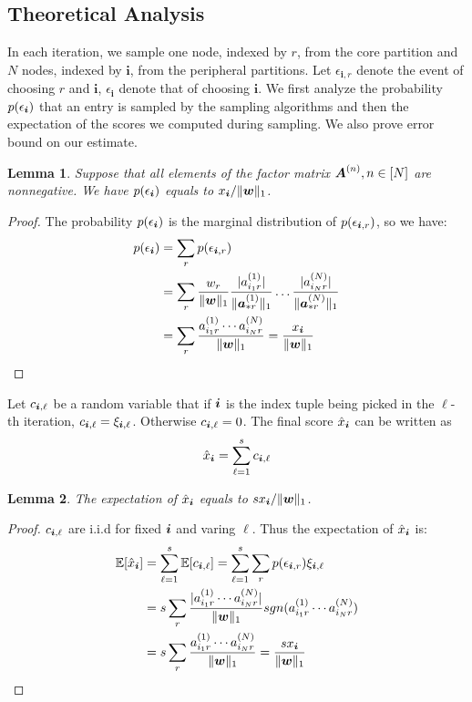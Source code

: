 \documentclass[letterpaper]{article}
\newcommand{\Sca}[3]{{#1}^{(#2)}_{i_#2#3}}%
\newcommand{\anr}[2]{\Sca{a}{#1}{#2}}
\newcommand{\score}[1]{\xi_{\V{i},#1}}
\newcommand{\V}[1]{{\boldsymbol{{\MakeLowercase{#1}}}}}
\newcommand{\ColVec}[3]{\V{#1}^{(#2)}_{#3}}
\newcommand{\NormColA}[2]{\norm{\ColVec{a}{#1}{*#2}}{1}}
\newcommand{\predx}{\hat{x}_{\V{i}}}
\newcommand{\M}[1]{{\boldsymbol{{\MakeUppercase{#1}}}}}
\newcommand{\norm}[2]{\|#1\|_{#2}}
\newtheorem{lemma}{Lemma}
\begin{document}
\subsection{Theoretical Analysis}
In each iteration,
we sample one node, indexed by $r$,
from the core partition and $N$ nodes,
indexed by $\boldsymbol{i}$, from the peripheral partitions.
Let $\epsilon_{\boldsymbol{i},r}$
denote the event of choosing $r$
and $\boldsymbol{i}$, $\epsilon_{\boldsymbol{i}}$ denote that of choosing $\boldsymbol{i}$.
We first analyze the probability $p(\epsilon_{\V{i}})$ that an entry is sampled by the sampling algorithms and then the expectation of the scores we computed during sampling. 
We also prove error bound on our estimate.

\begin{lemma}\label{lem:Probability}
    Suppose that all elements of the factor matrix $\M{A}^{(n)}, n\in[N]$ are nonnegative. We have
    $p(\epsilon_{\V{i}})$ equals to $x_{\V{i}}/\norm{\V{w}}{1}$.
\end{lemma}
\begin{proof}
The probability $p(\epsilon_{\V{i}})$ is the marginal distribution of $p(\epsilon_{\V{i},r})$,
so we have:
\begin{align*}
p(\epsilon_{\V{i}})
& = \sum_{r} p(\epsilon_{\V{i},r}) \\
& = \sum_{r} \frac{w_{r}}{\norm{\V{W}}{1}}
    \frac{|\anr{1}{r}|}{\NormColA{1}{r}} \ldots \frac{|\anr{N}{r}|}{\NormColA{N}{r}}\\
& = \sum_{r} \frac{\anr{1}{r}\cdots\anr{N}{r}}{\norm{\V{W}}{1}}
  = \frac{x_{\V{i}}}{\norm{\V{w}}{1}}
\end{align*}
\end{proof}
Let $c_{\V{i},\ell}$ be a random variable that if $\V{i}$ is the index tuple
being picked in the $\ell$-th iteration, $c_{\V{i},\ell}=\score{\ell}$.
Otherwise $c_{\V{i},\ell}=0$.
The final score $\predx$ can be written as
\begin{equation}\label{eq:score}
\predx = \sum_{\ell=1}^{s} c_{\V{i},\ell}
\end{equation}

\begin{lemma}\label{lem:Expectation}
The expectation of $\predx$ equals to $sx_{\V{i}}/\norm{\V{w}}{1}$.
\end{lemma}
\begin{proof}
    $c_{\V{i},\ell}$ are i.i.d for fixed $\V{i}$ and varing $\ell$.
    Thus the expectation of $\predx$ is:
\begin{align*}
\mathbb{E}[\predx]
& = \sum_{\ell=1}^{s}\mathbb{E}[c_{\V{i},\ell}] = \sum_{\ell=1}^{s}\sum_{r} p(\epsilon_{\V{i},r})\score{\ell} \\
& = s\sum_{r} \frac{|\anr{1}{r}\cdots\anr{N}{r}|}{\norm{\V{W}}{1}}
                  sgn(\anr{1}{r}\cdots\anr{N}{r})\\
& = s\sum_{r} \frac{\anr{1}{r}\cdots\anr{N}{r}}{\norm{\V{W}}{1}}
  = \frac{sx_{\V{i}}}{\norm{\V{w}}{1}}
\end{align*}
\end{proof}
\end{document}
